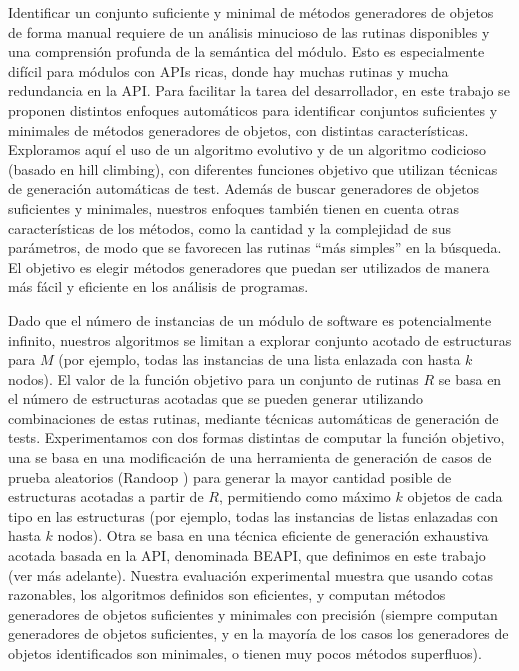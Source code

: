 Identificar un conjunto suficiente y minimal de métodos generadores de objetos de forma manual requiere de un análisis minucioso de las rutinas disponibles y una comprensión profunda de la semántica del módulo. Esto es especialmente difícil para módulos con APIs ricas, donde hay muchas rutinas y mucha redundancia en la API. Para facilitar la tarea del desarrollador, en este trabajo se proponen distintos enfoques automáticos para identificar conjuntos suficientes y minimales de métodos generadores de objetos, con distintas características. Exploramos aquí el uso de un algoritmo evolutivo y de un algoritmo codicioso (basado en hill climbing), con diferentes funciones objetivo que utilizan técnicas de generación automáticas de test. Además de buscar generadores de objetos suficientes y minimales, nuestros enfoques también tienen en cuenta otras características de los métodos, como la cantidad y la complejidad de sus parámetros, de modo que se favorecen las rutinas “más simples” en la búsqueda. El objetivo es elegir métodos generadores que puedan ser utilizados de manera más fácil y eficiente en los análisis de programas.

Dado que el número de instancias de un módulo de software es potencialmente infinito,
nuestros algoritmos se limitan a explorar conjunto acotado de estructuras para \(M\) \cite{Boyapati02} (por ejemplo, todas las instancias de una lista enlazada con hasta \(k\) nodos). El valor de la función objetivo para un conjunto de rutinas \(R\) se basa en el número de estructuras acotadas que se pueden generar utilizando combinaciones de estas rutinas, mediante técnicas automáticas de generación de tests. Experimentamos con dos formas distintas de computar la función objetivo, una se basa en una modificación de una herramienta de generación de casos de prueba aleatorios (Randoop \cite{Pacheco07}) para generar la mayor cantidad posible de estructuras acotadas a partir de \(R\), permitiendo como máximo \(k\) objetos de cada tipo en las estructuras (por ejemplo, todas las instancias de listas enlazadas con hasta \(k\) nodos).  Otra se basa en una técnica eficiente de generación exhaustiva acotada basada en la API, denominada BEAPI, que definimos en este trabajo (ver más adelante).
Nuestra evaluación experimental muestra que usando cotas razonables, los algoritmos definidos son eficientes, y computan métodos generadores de objetos suficientes y minimales con precisión (siempre computan generadores de objetos suficientes, y en la mayoría de los casos los generadores de objetos identificados son minimales, o tienen muy pocos métodos superfluos).


